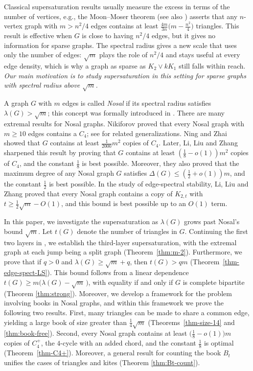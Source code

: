 \documentclass[11pt,a4paper]{article}
\theoremstyle{definition}
\theoremstyle{plain}
\renewcommand{\le}{\leqslant}
\renewcommand{\ge}{\geqslant}
\begin{document}
\smallskip 
Classical supersaturation results usually measure the excess in terms of the number of vertices, e.g., the Moon--Moser theorem \cite{MM1962} (see also \cite[page 443]{Lov1979}) asserts that any $n$-vertex 
graph with $m> n^2/4$ edges contains at least
$\frac{4m}{3n}\big(m- \frac{n^2}{4} \big)$ triangles. This result is effective when $G$ is close to having $n^2/4$ edges, but it gives no information for sparse graphs. The spectral radius gives a new scale that uses only the number of
edges: $\sqrt{m}$ plays the role of $ n^2/4 $ and  stays useful at every edge density, which is why a graph as sparse as $K_2\vee kK_1$ still
falls within reach. {\it Our main motivation is to study supersaturation in this setting for sparse graphs with spectral radius above $\sqrt{m}$.}  

\smallskip 
A graph $G$ with $m$ edges is called {\it Nosal} if its spectral radius satisfies $\lambda (G)> \sqrt{m}$; this concept was formally introduced in \cite{LiLiuZhang26}.  
There are many extremal results for Nosal graphs. Nikiforov \cite{Niki2009laa} proved that every Nosal graph with $m\ge 10$ edges contains a $C_4$; see \cite{LNW2021, ZS2022dm, LLZ2025, WL2026} for related generalizations. Ning and Zhai \cite{NZ2021b} showed that $G$ contains at least $\frac{1}{2000}m^2$ copies of $C_4$. Later, Li, Liu and Zhang \cite{LiLiuZhang26} sharpened this result by proving that $G$ contains  at least $(\frac{1}{8} - o(1))m^2$ copies of $C_4$, and the constant $\frac{1}{8}$ is best possible. 
Moreover, they \cite{LiLiuZhang26} also proved that the maximum degree of any Nosal graph $G$ satisfies $\Delta (G)\le (\frac{1}{2} + o(1))m$, and the constant $\frac{1}{2}$ is  best possible. 
In the study of edge-spectral stability, Li, Liu and Zhang \cite{LLZ-edge-spectral} proved that every Nosal graph contains a copy of $K_{2,t}$ with $t\ge \frac{1}{2} \sqrt{m} - O(1)$, and this bound is best possible up to an $O(1)$ term. 

 


\smallskip 
In this paper, 
we investigate the supersaturation as $\lambda(G)$ grows past Nosal's bound $\sqrt{m}$. Let $t(G)$ denote the number
of triangles in $G$. 
Continuing the first two layers in \cite{NingZhai2023, ZZ2026}, 
we establish the third-layer
supersaturation, with the extremal graph at each jump being a split graph (Theorem~\ref{thm:m-2}). Furthermore, we prove that if $q>0$ and $\lambda (G)\ge \sqrt{m} +q$, then $t(G)> qm$ (Theorem~\ref{thm-edge-spect-LS}). This bound follows from a linear dependence $t(G)\ge m\big(\lambda(G)-\sqrt{m}\,\big)$, with equality if and only if $G$ is complete bipartite (Theorem \ref{thm:strong}). Moreover, we develop a  framework for the problem involving books in Nosal graphs, and within this framework we prove the following two results. First, many triangles can be made to share a common edge, yielding a large book of size greater than $\frac{1}{4}\sqrt{m}$ (Theorems~\ref{thm-size-14} and \ref{thm:book-free}). Second, every Nosal graph contains at least $\big(\frac{1}{8} - o(1)\big)m$ copies of $C_4^+$, the $4$-cycle with an added chord, and the constant $\frac{1}{8}$ is optimal (Theorem~\ref{thm-C4+}). 
Moreover, a general result for counting the book $B_t$ unifies the cases of triangles and kites (Theorem \ref{thm:Bt-count}). 
\end{document}
